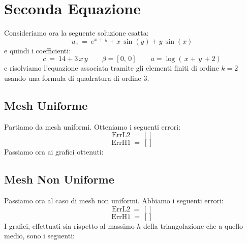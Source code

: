\documentclass[12pt,a4paper]{report}
\theoremstyle{theorem}
\theoremstyle{theorem}
\theoremstyle{definition}
\begin{document}
\section{Seconda Equazione}
Consideriamo ora la seguente soluzione esatta:
\[ u_e \ = \ e^{x \, + \, y} + x \, \sin(y) + y \, \sin(x) \]
e quindi i coefficienti:
\[ c \ = \ 14 + 3 \, x \, y \qquad \beta = [0, \, 0] \qquad a = \log(\, x + \, y \, + 2) \]
e risolviamo l'equazione associata tramite gli elementi finiti di ordine $k = 2$ usando una formula di quadratura di ordine $3$. 

\subsection{Mesh Uniforme}
Partiamo da mesh uniformi. Otteniamo i seguenti errori:
\[ \text{ErrL2} \ = \ [] \]
\[ \text{ErrH1} \ = \ [] \]
Passiamo ora ai grafici ottenuti:

\subsection{Mesh Non Uniforme}
Passiamo ora al caso di mesh non uniformi. Abbiamo i seguenti errori:
\[ \text{ErrL2} \ = \ [] \]
\[ \text{ErrH1} \ = \ [] \]
I grafici, effettuati sia rispetto al massimo $h$ della triangolazione che a quello medio, sono i seguenti:




\printindex

% 

%

\end{document}
